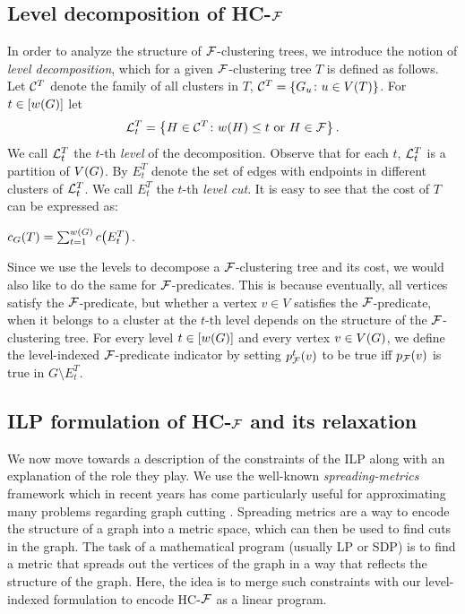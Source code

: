 \subsection{Level decomposition of \textsc{HC-$\mathcal{F}$}} \label{sec:levels}

In order to analyze the structure of $\mathcal{F}$-clustering trees, we introduce the notion of \emph{level decomposition}, which for a given $\mathcal{F}$-clustering tree $T$ is defined as follows.
Let $\mathcal{C}^T$ denote the family of all clusters in $T$, $\mathcal{C}^T=\mathopen{}\left\{ G_u\colon u\in V(T) \right\}$.
For $t\in [w\mathopen{}\left( G \right)]$ let
\[\mathcal{L}_t^T=\mathopen{}\left\{ H\in\mathcal{C}^T\colon w\mathopen{}\left( H \right)\leq t\textup{ or }H\in\mathcal{F} \right\}.\]
We call $\mathcal{L}_t^T$ the $t$-th \emph{level} of the decomposition.
Observe that for each $t$, $\mathcal{L}_t^T$ is a partition of $V\mathopen{}\left( G \right)$.
By $E_t^T$ denote the set of edges with endpoints in different clusters of $\mathcal{L}_t^T$. We call $E_t^T$ the $t$-th \emph{level cut}.
It is easy to see that the cost of $T$ can be expressed as:
\begin{observation}\label{obs:cost-decomposition}
    ${c}_G\mathopen{}\left( T \right) = \sum_{t=1}^{w\mathopen{}\left( G \right)} c\mathopen{}\left( E_t^T \right)$.
\end{observation}

Since we use the levels to decompose a $\mathcal{F}$-clustering tree and its cost, we would also like to do the same for $\mathcal{F}$-predicates. This is because eventually, all vertices satisfy the $\mathcal{F}$-predicate, but whether a vertex $v\in V$ satisfies the $\mathcal{F}$-predicate, when it belongs to a cluster at the $t$-th level depends on the structure of the $\mathcal{F}$-clustering tree.
For every level $t\in [w\mathopen{}\left( G \right)]$ and every vertex $v\in V\mathopen{}\left( G \right)$, we define the level-indexed $\mathcal{F}$-predicate indicator by setting $p_{\mathcal{F}}^t\mathopen{}\left( v \right)$ to be true iff $p_{\mathcal{F}}\mathopen{}\left( v \right)$ is true in $G\setminus E_t^T$. 
\subsection{\textsc{ILP} formulation of \textsc{HC-$\mathcal{F}$} and its relaxation}
    We now move towards a description of the constraints of the \textsc{ILP} along with an explanation of the role they play. We use the well-known \emph{spreading-metrics} framework which in recent years has come particularly useful for approximating many problems regarding graph cutting \cite{ExpanderFlowsGeometricEmbeddingsAndGraphPartitioning,PartitioningGraphsIntoBalancedComponents,ApproximateHierarchicalClusteringViaSparsestCutAndSpreadingMetrics,FastApproximateGraphPartitioningAlgorithms,DivideAndConquerApproximationAlgorithmsViaSpreadingMetrics}.
    Spreading metrics are a way to encode the structure of a graph into a metric space, which can then be used to find cuts in the graph. The task of a mathematical program (usually LP or SDP) is to find a metric that spreads out the vertices of the graph in a way that reflects the structure of the graph. Here, the idea is to merge such constraints with our level-indexed formulation to encode \textsc{HC-$\mathcal{F}$} as a linear program.

